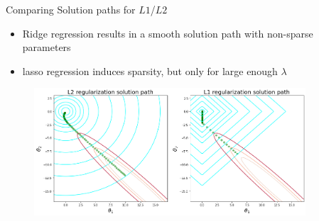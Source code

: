 \documentclass[11pt,compress,t,notes=noshow, xcolor=table]{beamer}
\begin{document}
\begin{vbframe}{Comparing Solution paths for $L1$/$L2$}
\begin{itemize}
    \item Ridge regression results in a smooth solution path with non-sparse parameters
    \item lasso regression induces sparsity, but only for large enough $\lambda$
\end{itemize}
 \lz
\begin{figure}
\includegraphics[width=0.9\textwidth]{figure_man/solution_paths_l1_l2.png}\\
\end{figure}

\end{vbframe}

 

\end{document}
